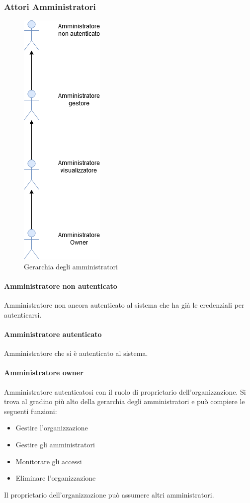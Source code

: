 \subsubsection{Attori Amministratori}
\begin{figure}[h]
  \caption{Gerarchia degli amministratori}
  \centering
    \includegraphics[scale=0.6]{sezioni/UseCase/Immagini/Amministratori.png}
\end{figure}


\paragraph{Amministratore non autenticato}
Amministratore non ancora autenticato al sistema che ha già le credenziali per autenticarsi.
\paragraph{Amministratore autenticato}
Amministratore che si è autenticato al sistema.
\paragraph{Amministratore owner}
Amministratore autenticatosi con il ruolo di proprietario dell'organizzazione.
Si trova al gradino più alto della gerarchia degli amministratori e può compiere le seguenti funzioni:
\begin{itemize}
\item Gestire l'organizzazione
\item Gestire gli amministratori
\item Monitorare gli accessi
\item Eliminare l'organizzazione
\end{itemize}
Il proprietario dell'organizzazione può assumere altri amministratori.
